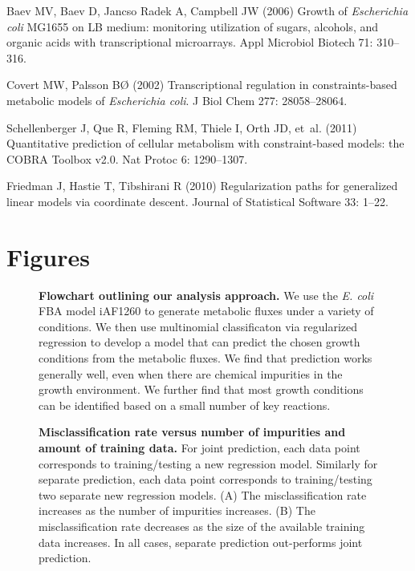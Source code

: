 \documentclass[12pt]{article}
\begin{document}
\begin{thebibliography}{10}
Baev MV, Baev D, {Jancso Radek} A, Campbell JW (2006) Growth of
  \emph{Escherichia coli} {MG1655} on {LB} medium: monitoring utilization of
  sugars, alcohols, and organic acids with transcriptional microarrays.
\newblock Appl Microbiol Biotech 71: 310--316.

Covert MW, Palsson B{\O} (2002) Transcriptional regulation in constraints-based
  metabolic models of \emph{Escherichia coli}.
\newblock J Biol Chem 277: 28058--28064.

Schellenberger J, Que R, Fleming RM, Thiele I, Orth JD, et~al. (2011)
  Quantitative prediction of cellular metabolism with constraint-based models:
  the {COBRA Toolbox} v2.0.
\newblock Nat Protoc 6: 1290--1307.

Friedman J, Hastie T, Tibshirani R (2010) Regularization paths for generalized
  linear models via coordinate descent.
\newblock Journal of Statistical Software 33: 1--22.

\end{thebibliography}



\newpage

\section*{Figures}

\begin{figure}[!ht]
\caption{\label{fig:flowchart}\textbf{Flowchart outlining our analysis approach.} We use the \emph{E. coli} FBA model iAF1260 to generate metabolic fluxes under a variety of conditions. We then use multinomial classificaton via regularized regression to develop a model that can predict the chosen growth conditions from the metabolic fluxes. We find that prediction works generally well, even when there are chemical impurities in the growth environment. We further find that most growth conditions can be identified based on a small number of key reactions.
}
\end{figure}

\clearpage
\begin{figure}[!ht]
\caption{\label{fig:misclassification}\textbf{Misclassification rate versus number of impurities and amount of training data.} For joint prediction, each data point corresponds to training/testing a new regression model. Similarly for separate prediction, each data point corresponds to training/testing two separate new regression models. (A) The misclassification rate increases as the number of impurities increases. (B) The misclassification rate decreases as the size of the available training data increases. In all cases, separate prediction out-performs joint prediction.}
\end{figure}
\end{document}
